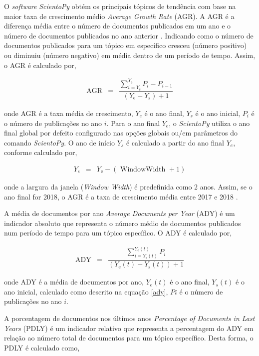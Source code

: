 O \textit{software} \textit{ScientoPy} obtém os principais tópicos de tendência com base na maior taxa de crescimento médio \textit{Average Growth Rate} (AGR). A AGR é a diferença média entre o número de documentos publicados em um ano e o número de documentos publicados no ano anterior \cite{scientopy}. Indicando como o número de documentos publicados para um tópico em específico cresceu (número positivo) ou diminuiu (número negativo) em média dentro de um período de tempo. Assim, o AGR é calculado por,

\begin{eqnarray}
	\mathrm{AGR}&=&\dfrac{\sum_{i=Y_{\mathrm{s}}}^{Y_{\mathrm{e}}} P_i-P_{i-1}}{\left(Y_{\mathrm{e}}-Y_{\mathrm{s}}\right)+1} \label{arg}
\end{eqnarray}

\noindent onde AGR é a taxa média de crescimento, $Y_e$ é o ano final, $Y_s$ é o ano inicial, $P_i$ é o número de publicações no ano $i$. Para o ano final $Y_e$, o \textit{ScientoPy} utiliza o ano final global por defeito configurado nas opções globais ou/em parâmetros do comando \textit{ScientoPy}. O ano de início $Y_s$ é calculado a partir do ano final $Y_e$, conforme calculado por,

\begin{eqnarray}
	Y_{\mathrm{s}}&=&Y_{\mathrm{e}}-(\text { WindowWidth }+1)\label{arg2}
\end{eqnarray}

\noindent onde a largura da janela (\textit{Window Width}) é predefinida como 2 anos. Assim, se o ano final for 2018, o AGR é a taxa de crescimento média entre 2017 e 2018 \cite{scientopy}.

A média de documentos por ano  \textit{Average Documents per Year} (ADY) é um indicador absoluto que representa o número médio de documentos publicados num período de tempo para um tópico específico. O ADY é calculado por,

\begin{eqnarray}
	\mathrm{ADY}&=&\dfrac{\sum_{i={Y_{\mathrm{s}}}(t)}^{Y_{\mathrm{e}}(t)} P_i}{\left(Y_{\mathrm{e}}(t)-Y_{\mathrm{s}}(t)\right)+1}\label{ady}
\end{eqnarray}

\noindent onde ADY é a média de documentos por ano, $Y_e(t)$ é o ano final, $Y_s(t)$ é o ano inicial, calculado como descrito na equação \eqref{ady}, $Pi$ é o número de publicações no ano $i$.

A porcentagem de documentos nos últimos anos  \textit{Percentage of Documents in Last Years} (PDLY) é um indicador relativo que representa a percentagem do ADY em relação ao número total de documentos para um tópico específico. Desta forma, o PDLY é calculado como,

